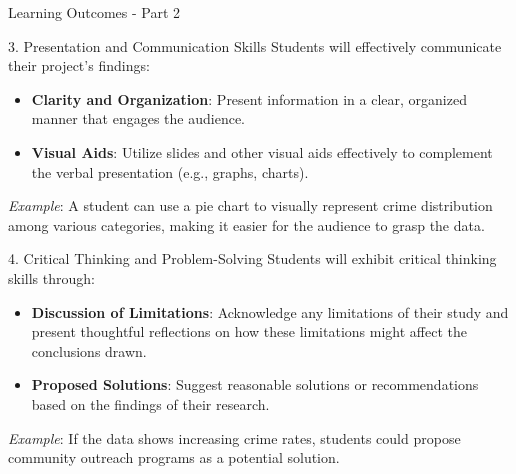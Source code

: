 \documentclass[aspectratio=169]{beamer}
\begin{document}
\begin{frame}[fragile]{Learning Outcomes - Part 2}
    \begin{block}{3. Presentation and Communication Skills}
        Students will effectively communicate their project’s findings:
        \begin{itemize}
            \item \textbf{Clarity and Organization}: Present information in a clear, organized manner that engages the audience.
            \item \textbf{Visual Aids}: Utilize slides and other visual aids effectively to complement the verbal presentation (e.g., graphs, charts).
        \end{itemize}
        \textit{Example}: A student can use a pie chart to visually represent crime distribution among various categories, making it easier for the audience to grasp the data.
    \end{block}

    \begin{block}{4. Critical Thinking and Problem-Solving}
        Students will exhibit critical thinking skills through:
        \begin{itemize}
            \item \textbf{Discussion of Limitations}: Acknowledge any limitations of their study and present thoughtful reflections on how these limitations might affect the conclusions drawn.
            \item \textbf{Proposed Solutions}: Suggest reasonable solutions or recommendations based on the findings of their research.
        \end{itemize}
        \textit{Example}: If the data shows increasing crime rates, students could propose community outreach programs as a potential solution.
    \end{block}
\end{frame}
\end{document}
